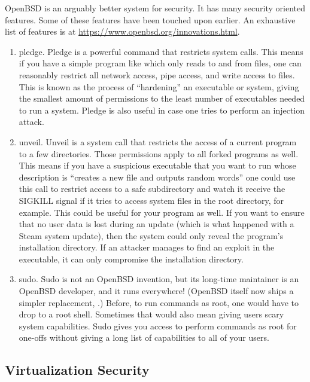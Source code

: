 OpenBSD is an arguably better system for security.
It has many security oriented features.
Some of these features have been touched upon earlier.
An exhaustive list of features is at \url{https://www.openbsd.org/innovations.html}.

\begin{enumerate}
\item pledge.
  Pledge is a powerful command that restricts system calls.
  This means if you have a simple program like  which only reads to and from files, one can reasonably restrict all network access, pipe access, and write access to files.
  This is known as the process of ``hardening'' an executable or system, giving the smallest amount of permissions to the least number of executables needed to run a system.
  Pledge is also useful in case one tries to perform an injection attack.
\item unveil.
  Unveil is a system call that restricts the access of a current program to a few directories.
  Those permissions apply to all forked programs as well.
  This means if you have a suspicious executable that you want to run whose description is ``creates a new file and outputs random words'' one could use this call to restrict access to a safe subdirectory and watch it receive the SIGKILL signal if it tries to access system files in the root directory, for example.
  This could be useful for your program as well.
  If you want to ensure that no user data is lost during an update (which is what happened with a Steam system update), then the system could only reveal the program's installation directory.
  If an attacker manages to find an exploit in the executable, it can only compromise the installation directory.
\item sudo.
  Sudo is not an OpenBSD invention, but its long-time maintainer is an OpenBSD developer, and it runs everywhere! (OpenBSD itself now ships a simpler replacement, .)
  Before, to run commands as root, one would have to drop to a root shell.
  Sometimes that would also mean giving users scary system capabilities.
  Sudo gives you access to perform commands as root for one-offs without giving a long list of capabilities to all of your users.
\end{enumerate}

\subsection{Virtualization Security}

